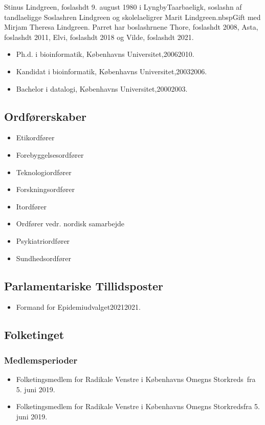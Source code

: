 \documentclass[11pt, a4paper]{awesome-cv}
\begin{document}
\makecvheader[R]
\makelettertitle
\begin{cvletter}
Stinus Lindgreen, foslashdt 9. august 1980 i LyngbyTaarbaeligk, soslashn af tandlaeligge Soslashren Lindgreen og skolelaeligrer Marit Lindgreen.nbspGift med Mirjam Theresa Lindgreen. Parret har boslashrnene Thore, foslashdt 2008, Asta, foslashdt 2011, Elvi, foslashdt 2018 og Vilde, foslashdt 2021.

\begin{itemize}
\item Ph.d. i bioinformatik, Københavns Universitet,20062010.
\item Kandidat i bioinformatik, Københavns Universitet,20032006.
\item Bachelor i datalogi, Københavns Universitet,20002003.
\end{itemize}
\subsection*{Ordførerskaber}
\begin{itemize}
\item Etikordfører
\item Forebyggelsesordfører
\item Teknologiordfører
\item Forskningsordfører
\item Itordfører
\item Ordfører vedr. nordisk samarbejde
\item Psykiatriordfører
\item Sundhedsordfører
\end{itemize}
\subsection*{Parlamentariske Tillidsposter}
\begin{itemize}
\item Formand for Epidemiudvalget20212021.
\end{itemize}
\subsection*{Folketinget}
\subsubsection*{Medlemsperioder}
\begin{itemize}
\item Folketingsmedlem for Radikale Venstre i Københavns Omegns Storkreds fra 5. juni 2019.
\item Folketingsmedlem for Radikale Venstre i Københavns Omegns Storkredsfra 5. juni 2019.
\end{itemize}

\end{cvletter}
\end{document}
